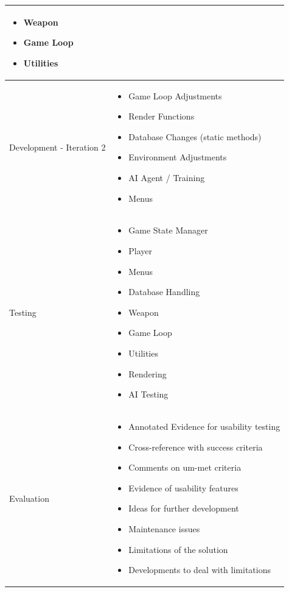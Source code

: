 \begin{center}
\begin{longtable}{|p{3.5cm}|p{10cm}|}
\begin{itemize}
        \item Weapon
        \item Game Loop
        \item Utilities
    \end{itemize}\\
    \hline
    Development - Iteration 2 & \begin{itemize}
        \item Game Loop Adjustments
        \item Render Functions
        \item Database Changes (static methods)
        \item Environment Adjustments
        \item AI Agent / Training
        \item Menus
    \end{itemize}\\
    \hline
    Testing & \begin{itemize}
        \item Game State Manager
        \item Player
        \item Menus
        \item Database Handling
        \item Weapon
        \item Game Loop
        \item Utilities
        \item Rendering
        \item AI Testing
    \end{itemize}\\
    \hline
    Evaluation & \begin{itemize}
        \item Annotated Evidence for usability testing
        \item Cross-reference with success criteria
        \item Comments on um-met criteria
        \item Evidence of usability features
        \item Ideas for further development
        \item Maintenance issues
        \item Limitations of the solution
        \item Developments to deal with limitations
    \end{itemize}\\
    \hline
\end{longtable}
\end{center}

